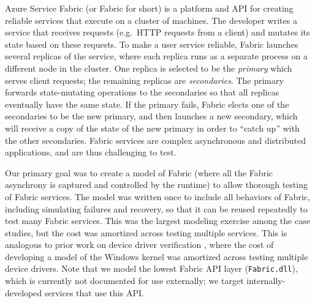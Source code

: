 Azure Service Fabric
(or Fabric for short) is a platform and API for creating reliable services that execute on a cluster of machines. 
The developer writes a service that receives requests (e.g.\ HTTP requests from a client) and mutates its state based on these requests. 
To make a user service reliable, Fabric launches several replicas of the service, where each replica runs as a separate process on a different node in the cluster.
One replica is selected to be the \emph{primary} which serves client requests; the remaining replicas are \emph{secondaries}. The primary forwards state-mutating operations to the secondaries 
so that all replicas eventually have the same state. 
If the primary fails,
Fabric elects one of the secondaries to be the new primary, and then launches a new secondary, which will receive 
a copy
of the state of the new primary in order to ``catch up'' with the other secondaries. 
Fabric services are complex asynchronous and distributed applications, and are thus challenging to test.

Our primary goal was to create a \psharp model of Fabric (where all the Fabric asynchrony is captured and controlled by the \psharp runtime) to allow thorough testing of Fabric services.
The model was written once
to include all behaviors of Fabric, including simulating failures and recovery,
so that it can be reused repeatedly to test many Fabric services.
This was the largest modeling exercise among the case studies, but the cost
was amortized across testing multiple services. This is analogous to prior work
on device driver verification \cite{ball2011slam}, where the cost of developing a model
of the Windows kernel was amortized across testing multiple device drivers.
Note that we model the lowest Fabric API layer (\texttt{Fabric.dll}),
which is currently not documented for use externally;
we target internally-developed services that use this API. 


